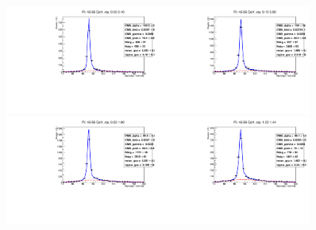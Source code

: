 \begin{figure}[htb]
  \begin{center}
   \includegraphics[width=0.45\textwidth]{../figs/figs_v11/ELECTRON_WGamma/EtoGammaFits/sa_hZmass_h_Data_EtoGamma_Enr_BARREL_pt45to55_ieta0.pdf}\includegraphics[width=0.45\textwidth]{../figs/figs_v11/ELECTRON_WGamma/EtoGammaFits/sa_hZmass_h_Data_EtoGamma_Enr_BARREL_pt45to55_ieta1.pdf}\\
   \includegraphics[width=0.45\textwidth]{../figs/figs_v11/ELECTRON_WGamma/EtoGammaFits/sa_hZmass_h_Data_EtoGamma_Enr_BARREL_pt45to55_ieta2.pdf}\includegraphics[width=0.45\textwidth]{../figs/figs_v11/ELECTRON_WGamma/EtoGammaFits/sa_hZmass_h_Data_EtoGamma_Enr_BARREL_pt45to55_ieta3.pdf}\\

\end{center}
\end{figure}
